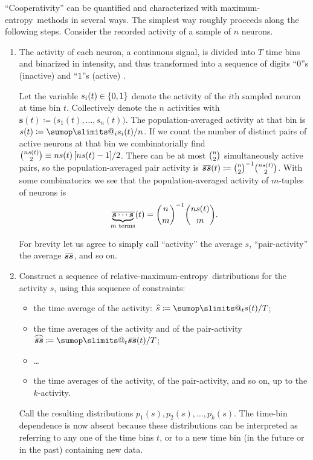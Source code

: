 \documentclass[\ifafour a4paper,12pt,\else a5paper,10pt,\fi%
onecolumn,oneside,article,%
british%
]{memoir}
\makeatletter
\theoremstyle{remark}
\theoremstyle{innote}
\def\sum{\DOTSI\sumop\slimits@}
\newcommand*{\citep}{\parencites}
\newcommand*{\defd}{\coloneqq}
\DeclarePairedDelimiter\set{\{}{\}}
\renewcommand*{\|}{\nonscript\,\vert\nonscript\;\mathopen{}}
\newcommand*{\cf}{{cf.}}
\newcommand*{\widebar}[1]{{\mkern1.5mu\skew{2}\overline{\mkern-1.5mu#1\mkern-1.5mu}\mkern 1.5mu}}
\newcommand*{\tav}{\widehat} %
\newcommand*{\av}{\widebar} %
\newcommand*{\yrv}{s}
\newcommand*{\yr}{\bm{\yrv}}%
\newcommand*{\yrs}{\yrv}%
\newcommand*{\me}{maximum-entropy}
\makeatother
\begin{document}
\enquote{Cooperativity} can be quantified and characterized with \me\
methods in several ways. The simplest way roughly proceeds along the
following steps. Consider the recorded activity of a sample of $n$ neurons.
\begin{enumerate}
\item The activity of each neuron, a continuous signal, is divided into $T$
  time bins and binarized in intensity, and thus transformed into a
  sequence of digits \enquote{$0$}s (inactive) and \enquote{$1$}s (active)
  \citep[\cf][]{caianiello1961,caianiello1986}.

  Let the variable $\yrv_i(t)\in\set{0,1}$ denote the activity of the $i$th
  sampled neuron at time bin $t$. Collectively denote the $n$ activities
  with $\yr(t) \defd \bigl(\yrv_1(t),\dotsc,\yrv_n(t)\bigr)$. The
  population-averaged activity at that bin is
  $\yrs(t) \defd \sum_i \yrv_i(t)/n$. If we count the number of distinct
  pairs of active neurons at that bin we combinatorially find
  $\tbinom{n\yrs(t)}{2}\equiv n\yrs(t)\,[n\yrs(t)-1]/2$. There can be at
  most $\tbinom{n}{2}$ simultaneously active pairs, so the
  population-averaged pair activity is
  $\av{\yr \yr}(t) \defd \tbinom{n}{2}^{-1}\tbinom{n\yrs(t)}{2}$. With some
  combinatorics we see that the population-averaged activity of $m$-tuples
  of neurons is
  \begin{equation}
    \label{eq:products_intermsof_average}
    \av{\underbrace{\yr\dotsm\yr}_{\text{$m$ terms}}}(t)
    = \binom{n}{m}^{-1}\binom{n\yrs(t)}{m}.
  \end{equation}
  
  For brevity let us agree to simply call \enquote{activity} the average
  $\yrs$, \enquote{pair-activity} the average $\av{\yr \yr}$, and so on.

\item Construct a sequence of relative-\me\ distributions for the activity
  $\yrs$, using this sequence of constraints:
  \begin{itemize}
  \item the time average of the activity: $\tav{\yrs} \defd \sum_t\yrs(t)/T$;
  \item the time averages of the activity and of the pair-activity
    $\tav{\av{\yr \yr}} \defd \sum_t\av{\yr \yr}(t)/T$;
  \item \ldots
  \item the time averages of the activity, of the pair-activity, and so on, up
    to the $k$-activity.
  \end{itemize}
  Call the resulting distributions $p_1(\yrs), p_2(\yrs),\dotsc,p_k(\yrs)$.
  The time-bin dependence is now absent because these distributions can be
  interpreted as referring to any one of the time bins $t$, or to a new
  time bin (in the future or in the past) containing new data.


\end{enumerate}
\end{document}
